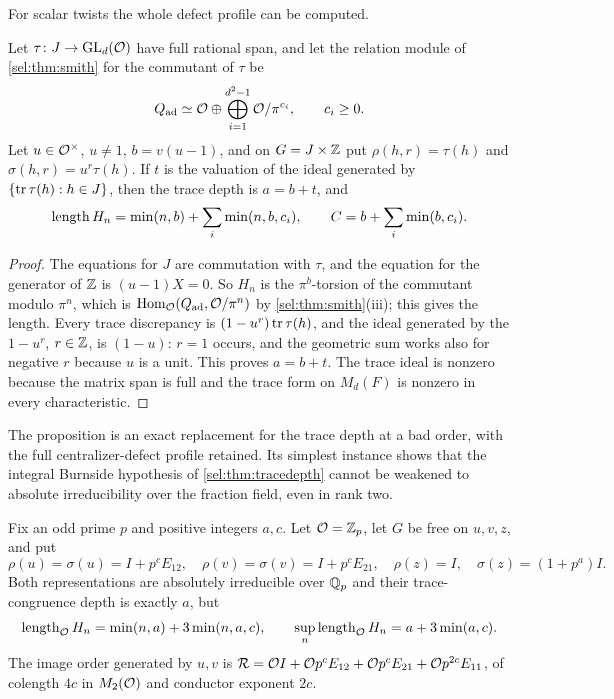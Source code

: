 For scalar twists the whole defect profile can be computed.

\begin{proposition}\label{sel:prop:scalartwist}
Let $\tau\colon J\to\operatorname{GL}_d(\mathcal{O})$ have full rational span, and let the relation
module of \cref{sel:thm:smith} for the commutant of $\tau$ be
\[
 Q_{\mathrm{ad}}\simeq\mathcal{O}\oplus\bigoplus_{i=1}^{d^2-1}\mathcal{O}/\pi^{c_i},\qquad c_i\ge0.
\]
Let $u\in\mathcal{O}^\times$, $u\ne1$, $b=v(u-1)$, and on $G=J\times\mathbb{Z}$ put
$\rho(h,r)=\tau(h)$ and $\sigma(h,r)=u^r\tau(h)$. If $t$ is the valuation of
the ideal generated by $\{\operatorname{tr}\tau(h):h\in J\}$, then the trace depth is
$a=b+t$, and
\[
 \operatorname{length} H_n=\min(n,b)+\sum_i\min(n,b,c_i),\qquad C=b+\sum_i\min(b,c_i).
\]
\end{proposition}

\begin{proof}
The equations for $J$ are commutation with $\tau$, and the equation for the
generator of $\mathbb{Z}$ is $(u-1)X=0$. So $H_n$ is the $\pi^b$-torsion of the
commutant modulo $\pi^n$, which is $\operatorname{Hom}_{\mathcal{O}}(Q_{\mathrm{ad}},\mathcal{O}/\pi^n)$
by \cref{sel:thm:smith}(iii); this gives the length. Every trace
discrepancy is $(1-u^r)\operatorname{tr}\tau(h)$, and the ideal generated by the $1-u^r$,
$r\in\mathbb{Z}$, is $(1-u)$: $r=1$ occurs, and the geometric sum works also for
negative $r$ because $u$ is a unit. This proves $a=b+t$. The trace ideal is
nonzero because the matrix span is full and the trace form on $M_d(F)$ is
nonzero in every characteristic.
\end{proof}

The proposition is an exact replacement for the trace depth at a bad order,
with the full centralizer-defect profile retained. Its simplest instance
shows that the integral Burnside hypothesis of \cref{sel:thm:tracedepth}
cannot be weakened to absolute irreducibility over the fraction field, even
in rank two.

\begin{example}\label{sel:thm:bad}
Fix an odd prime $p$ and positive integers $a,c$. Let $\mathcal{O}=\mathbb{Z}_p$, let $G$ be
free on $u,v,z$, and put
\[
 \rho(u)=\sigma(u)=I+p^cE_{12},\quad
 \rho(v)=\sigma(v)=I+p^cE_{21},\quad
 \rho(z)=I,\quad\sigma(z)=(1+p^a)I .
\]
Both representations are absolutely irreducible over $\mathbb{Q}_p$ and their
trace-congruence depth is exactly $a$, but
\begin{equation}\label{sel:eq:badlength}
 \operatorname{length}_{\mathcal{O}}H_n=\min(n,a)+3\min(n,a,c),\qquad
 \sup_n\operatorname{length}_{\mathcal{O}}H_n=a+3\min(a,c).
\end{equation}
The image order generated by $u,v$ is
$\mathcal R=\mathcal{O} I+\mathcal{O} p^cE_{12}+\mathcal{O} p^cE_{21}+\mathcal{O} p^{2c}E_{11}$, of colength
$4c$ in $M_2(\mathcal{O})$ and conductor exponent $2c$.
\end{example}

